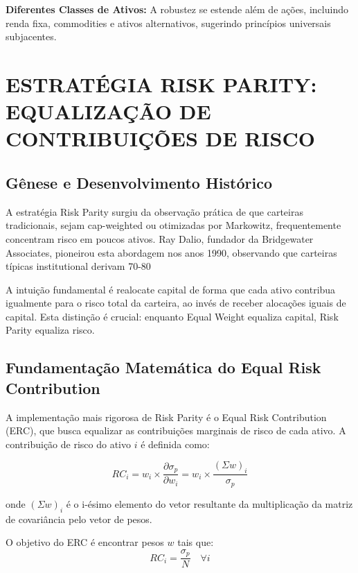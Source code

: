 \textbf{Diferentes Classes de Ativos:} A robustez se estende além de ações, incluindo renda fixa, commodities e ativos alternativos, sugerindo princípios universais subjacentes.

\section{ESTRATÉGIA RISK PARITY: EQUALIZAÇÃO DE CONTRIBUIÇÕES DE RISCO}

\subsection{Gênese e Desenvolvimento Histórico}

A estratégia Risk Parity surgiu da observação prática de que carteiras tradicionais, sejam cap-weighted ou otimizadas por Markowitz, frequentemente concentram risco em poucos ativos. Ray Dalio, fundador da Bridgewater Associates, pioneirou esta abordagem nos anos 1990, observando que carteiras típicas institutional derivam 70-80%

A intuição fundamental é realocate capital de forma que cada ativo contribua igualmente para o risco total da carteira, ao invés de receber alocações iguais de capital. Esta distinção é crucial: enquanto Equal Weight equaliza capital, Risk Parity equaliza risco.

\subsection{Fundamentação Matemática do Equal Risk Contribution}

A implementação mais rigorosa de Risk Parity é o Equal Risk Contribution (ERC), que busca equalizar as contribuições marginais de risco de cada ativo. A contribuição de risco do ativo $i$ é definida como:

\begin{equation}
RC_i = w_i \times \frac{\partial \sigma_p}{\partial w_i} = w_i \times \frac{(\Sigma w)_i}{\sigma_p}
\end{equation}

onde $(\Sigma w)_i$ é o i-ésimo elemento do vetor resultante da multiplicação da matriz de covariância pelo vetor de pesos.

O objetivo do ERC é encontrar pesos $w$ tais que:
\begin{equation}
RC_i = \frac{\sigma_p}{N} \quad \forall i
\end{equation}

